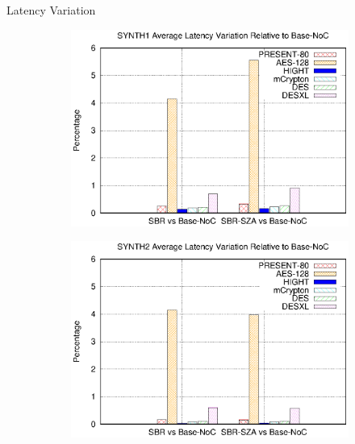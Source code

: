 \begin{frame}{Latency Variation}
	\begin{center}
		\begin{figure}
			\begin{subfigure}{0.49\linewidth}
				\includegraphics[width=1.0\linewidth]{charts/synth1/synth1-path-cost-comparison-relative.eps}
			\end{subfigure}
			\begin{subfigure}{0.49\linewidth}
				\includegraphics[width=1.0\linewidth]{charts/synth2/synth2-path-cost-comparison-relative.eps}
			\end{subfigure}
			\begin{subfigure}{0.49\linewidth}

\end{subfigure}
\end{figure}
\end{center}
\end{frame}
